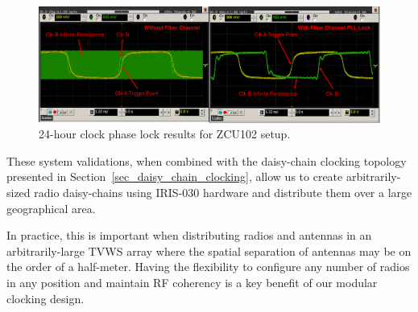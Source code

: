 \begin{figure}[p]
\centering
\includegraphics[width=1\textwidth]{figs/clk/zcu102_clock_lock}
\caption{24-hour clock phase lock results for ZCU102 setup.}
\label{fig_zcu_lock}
\end{figure}

These system validations, when combined with the daisy-chain clocking topology presented in Section~\ref{sec_daisy_chain_clocking}, allow us to create arbitrarily-sized radio daisy-chains using IRIS-030 hardware and distribute them over a large geographical area.

In practice, this is important when distributing radios and antennas in an arbitrarily-large \ac{TVWS} array where the spatial separation of antennas may be on the order of a half-meter.
Having the flexibility to configure any number of radios in any position and maintain RF coherency is a key benefit of our modular clocking design.

\pagebreak
